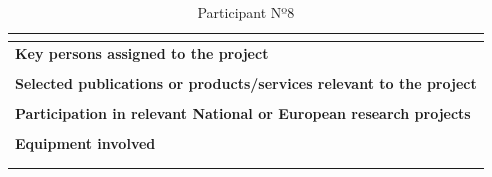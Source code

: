 \begin{longtable}[H]{|p{0.7cm}|p{4cm}|p{7cm}|p{1.3cm}|}
	\multicolumn{4}{|p{13cm}|}{}  \\ \hline
	
	\multicolumn{4}{|p{13cm}|}{\textbf{Key persons assigned to the project}}   \\ \hline
	
	\multicolumn{4}{|p{13cm}|}{}  \\ \hline
	
	\multicolumn{4}{|p{13cm}|}{\textbf{Selected publications or products/services relevant to the project}}  \\ \hline
	
	\multicolumn{4}{|p{13cm}|}{}  \\ \hline
	
	\multicolumn{4}{|p{13cm}|}{\textbf{Participation in relevant National or European research projects}}  \\ \hline
	
	\multicolumn{4}{|p{13cm}|}{}  \\ \hline
	
	\multicolumn{4}{|p{13cm}|}{\textbf{Equipment involved}}  \\ \hline
	
	\multicolumn{4}{|p{13cm}|}{}  \\ \hline
	\caption{Participant Nº8}
\end{longtable}